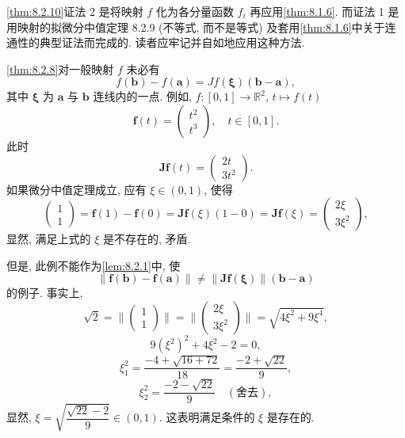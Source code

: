 \begin{remark}\label{rem:8.2.4}
\cref{thm:8.2.10}证法 2 是将映射 $f$ 化为各分量函数 $f_{i}$ 再应用\cref{thm:8.1.6}. 而证法 1 是用映射的拟微分中值定理 8.2.9 (不等式, 而不是等式) 及套用\cref{thm:8.1.6}中关于连通性的典型证法而完成的. 读者应牢记并自如地应用这种方法.
\end{remark}



\begin{example}\label{ex:8.2.1}
\cref{thm:8.2.8}对一般映射 $f$ 未必有
\[
  f(\boldsymbol{b}) - f(\boldsymbol{a}) = Jf(\boldsymbol{\xi})(\boldsymbol{b} - \boldsymbol{a}),
\]
其中 $\boldsymbol{\xi}$ 为 $\boldsymbol{a}$ 与 $\boldsymbol{b}$ 连线内的一点. 例如, $f: [0, 1] \to \mathbb{R}^{2}$, $t \mapsto f(t)$
\[
  \boldsymbol{f}(t) = \begin{pmatrix} t^{2} \\ t^{3} \end{pmatrix}, \quad t \in [0, 1].
\]
此时
\[
  \boldsymbol{J}\boldsymbol{f}(t) = \begin{pmatrix} 2t \\ 3t^{2} \end{pmatrix}.
\]
如果微分中值定理成立, 应有 $\xi \in (0, 1)$, 使得
\[
  \begin{pmatrix} 1 \\ 1 \end{pmatrix} = \boldsymbol{f}(1) - \boldsymbol{f}(0) = \boldsymbol{J}\boldsymbol{f}(\xi)(1 - 0) = \boldsymbol{J}\boldsymbol{f}(\xi) = \begin{pmatrix} 2\xi \\ 3\xi^{2} \end{pmatrix},
\]
显然, 满足上式的 $\xi$ 是不存在的, 矛盾.

但是, 此例不能作为\cref{lem:8.2.1}中, 使
\[
  \|\boldsymbol{f}(\boldsymbol{b}) - \boldsymbol{f}(\boldsymbol{a})\| \neq \|\boldsymbol{J}\boldsymbol{f}(\boldsymbol{\xi})\|(\boldsymbol{b} - \boldsymbol{a})
\]
的例子. 事实上,
\[
  \sqrt{2} = \Big\|\begin{pmatrix} 1 \\ 1 \end{pmatrix}\Big\| = \Big\|\begin{pmatrix} 2\xi \\ 3\xi^{2} \end{pmatrix}\Big\| = \sqrt{4\xi^{2} + 9\xi^{4}},
\]
\[
  9(\xi^{2})^{2} + 4\xi^{2} - 2 = 0,
\]
\[
  \xi_{1}^{2} = \frac{-4 + \sqrt{16 + 72}}{18} = \frac{-2 + \sqrt{22}}{9},
\]
\[
  \xi_{2}^{2} = \frac{-2 - \sqrt{22}}{9} \quad (\text{舍去}),
\]
显然, $\xi = \sqrt{\dfrac{\sqrt{22} - 2}{9}} \in (0, 1)$. 这表明满足条件的 $\xi$ 是存在的.
\end{example}

